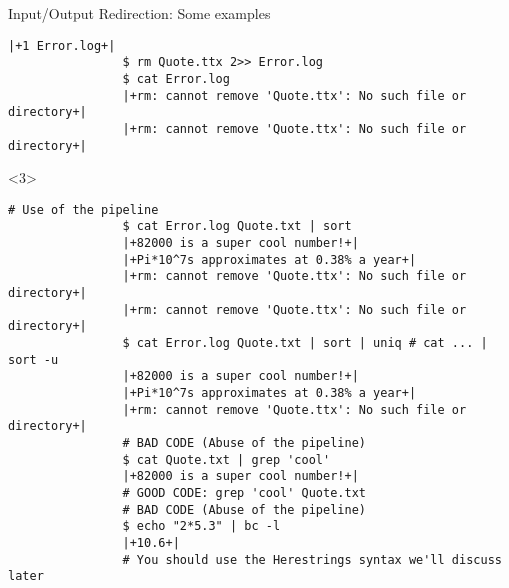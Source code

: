 \begin{frame}[fragile]{Input/Output Redirection: Some examples}
\begin{overlayarea}{\textwidth}{0.7\textheight}
\begin{onlyenv}
\begin{lstlisting}[style=MyBash, aboveskip=2mm, firstnumber=19]
                |+1 Error.log+|
                $ rm Quote.ttx 2>> Error.log
                $ cat Error.log
                |+rm: cannot remove 'Quote.ttx': No such file or directory+|
                |+rm: cannot remove 'Quote.ttx': No such file or directory+|
            \end{lstlisting}
        \end{onlyenv}
        \begin{onlyenv}<3>
            \begin{lstlisting}[style=MyBash, aboveskip=2mm, firstnumber=37]
                # Use of the pipeline
                $ cat Error.log Quote.txt | sort
                |+82000 is a super cool number!+|
                |+Pi*10^7s approximates at 0.38% a year+|
                |+rm: cannot remove 'Quote.ttx': No such file or directory+|
                |+rm: cannot remove 'Quote.ttx': No such file or directory+|
                $ cat Error.log Quote.txt | sort | uniq # cat ... | sort -u
                |+82000 is a super cool number!+|
                |+Pi*10^7s approximates at 0.38% a year+|
                |+rm: cannot remove 'Quote.ttx': No such file or directory+|
                # BAD CODE (Abuse of the pipeline)
                $ cat Quote.txt | grep 'cool'
                |+82000 is a super cool number!+|
                # GOOD CODE: grep 'cool' Quote.txt
                # BAD CODE (Abuse of the pipeline)
                $ echo "2*5.3" | bc -l
                |+10.6+|
                # You should use the Herestrings syntax we'll discuss later
            \end{lstlisting}
        \end{onlyenv}
    \end{overlayarea}
\end{frame}
